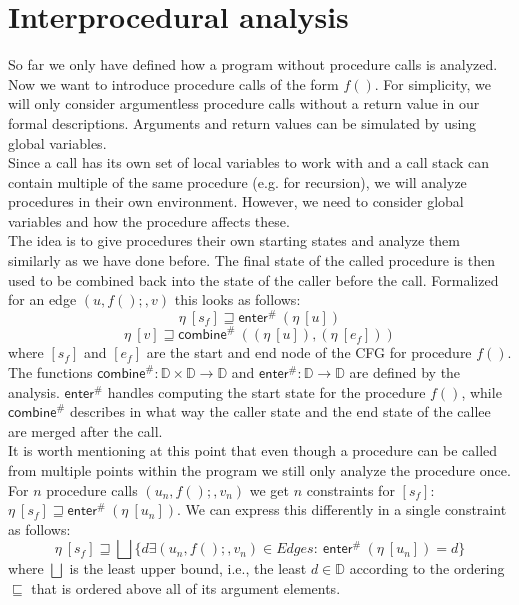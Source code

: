   \section{Interprocedural analysis}
    So far we only have defined how a program without procedure calls is analyzed. Now we want to introduce procedure calls of the form $f()$. For simplicity, we will only consider argumentless procedure calls without a return value in our formal descriptions. Arguments and return values can be simulated by using global variables.\\
    Since a call has its own set of local variables to work with and a call stack can contain multiple of the same procedure (e.g. for recursion), we will analyze procedures in their own environment. However, we need to consider global variables and how the procedure affects these.\\
    The idea is to give procedures their own starting states and analyze them similarly as we have done before. The final state of the called procedure is then used to be combined back into the state of the caller before the call. Formalized for an edge $(u, f();, v)$ this looks as follows:
    \[\eta\ [s_f] \sqsupseteq \textsf{enter}^{\#}\ (\eta\ [u]) \]
    \[\eta\ [v] \sqsupseteq  \textsf{combine}^{\#}\ ((\eta\ [u]), (\eta\ [e_f])) \]
    where $[s_f]$ and $[e_f]$ are the start and end node of the \ac{CFG} for procedure $f()$. The functions $\textsf{combine}^{\#}: \mathbb{D} \times \mathbb{D} \rightarrow \mathbb{D}$ and $\textsf{enter}^{\#}: \mathbb{D} \rightarrow \mathbb{D}$ are defined by the analysis. $\textsf{enter}^{\#}$ handles computing the start state for the procedure $f()$, while $\textsf{combine}^{\#}$ describes in what way the caller state and the end state of the callee are merged after the call.\\
    It is worth mentioning at this point that even though a procedure can be called from multiple points within the program we still only analyze the procedure once. For $n$ procedure calls $(u_n, f();, v_n)$ we get $n$ constraints for $[s_f]$: $\eta\ [s_f] \sqsupseteq \textsf{enter}^{\#}\ (\eta\ [u_n])$. We can express this differently in a single constraint as follows:
    \[\eta\ [s_f] \sqsupseteq \bigsqcup \{ d \exists (u_n, f();, v_n) \in Edges:\ \textsf{enter}^{\#}\ (\eta\ [u_n]) = d \}\]
    where $\bigsqcup$ is the least upper bound, i.e., the least $d \in \mathbb{D}$ according to the ordering $\sqsubseteq$ that is ordered above all of its argument elements.\\
    \\
